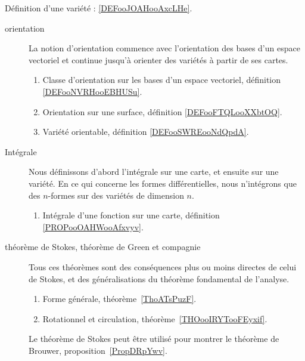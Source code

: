 Définition d'une variété : \ref{DEFooJOAHooAxcLHe}.
\begin{description}
	\item[orientation]
		La notion d'orientation commence avec l'orientation des bases d'un espace vectoriel et continue jusqu'à orienter des variétés à partir de ses cartes.
		\begin{enumerate}
			\item
			      Classe d'orientation sur les bases d'un espace vectoriel, définition \ref{DEFooNVRHooEBHUSu}.
			\item
			      Orientation sur une surface, définition \ref{DEFooFTQLooXXbtOQ}.
			\item
			      Variété orientable, définition \ref{DEFooSWREooNdQpdA}.
		\end{enumerate}
	\item[Intégrale]
		Nous définissons d'abord l'intégrale sur une carte, et ensuite sur une variété. En ce qui concerne les formes différentielles, nous n'intégrons que des \( n\)-formes sur des variétés de dimension \( n\).
		\begin{enumerate}
			\item
			      Intégrale d'une fonction sur une carte, définition \ref{PROPooOAHWooAfxvyv}.
		\end{enumerate}
	\item[théorème de Stokes, théorème de Green et compagnie]
		Tous ces théorèmes sont des conséquences plus ou moins directes de celui de Stokes, et des généralisations du théorème fondamental de l'analyse.
		\begin{enumerate}
			\item
			      Forme générale, théorème~\ref{ThoATsPuzF}.
			\item
			      Rotationnel et circulation, théorème~\ref{THOooIRYTooFEyxif}.
		\end{enumerate}
		Le théorème de Stokes peut être utilisé pour montrer le théorème de Brouwer, proposition~\ref{PropDRpYwv}.
\end{description}
